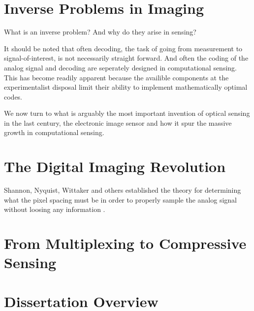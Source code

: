 \section{Inverse Problems in Imaging}

What is an inverse problem? And why do they arise in sensing?

It should be noted that often decoding, the task of going from measurement to signal-of-interest, is not necessarily straight forward. And often the coding of the analog signal and decoding are seperately designed in computational sensing. This has become readily apparent because the availible components at the experimentalist disposal limit their ability to implement mathematically optimal codes.

We now turn to what is arguably the most important invention of optical sensing in the last century, the electronic image sensor and how 
it spur the massive growth in computational sensing.

\section{The Digital Imaging Revolution}

Shannon, Nyquist, Wittaker and others established the theory for determining what the pixel spacing must be in order to properly sample the analog signal without loosing any information \cite{shannon1949communication, nyquist1924certain, nyquist1928certain}. 

\section{From Multiplexing to Compressive Sensing}\label{sec:multiplexingtocompressivesensing}

\section{Dissertation Overview}



%  
%

